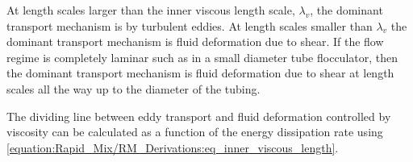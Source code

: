 \documentclass[letterpaper,10pt,english]{sphinxmanual}
\begin{document}
At length scales larger than the inner viscous length scale, \(\lambda_v\), the dominant transport mechanism is by turbulent eddies. At length scales smaller than \(\lambda_v\) the dominant transport mechanism is fluid deformation due to shear. If the flow regime is completely laminar such as in a small diameter tube flocculator, then the dominant transport mechanism is fluid deformation due to shear at length scales all the way up to the diameter of the tubing.

The dividing line between eddy transport and fluid deformation controlled by viscosity can be calculated as a function of the energy dissipation rate using \eqref{equation:Rapid_Mix/RM_Derivations:eq_inner_viscous_length}.

%
\begin{sphinxVerbatim}[commandchars=\\\{\}]
  
  
   
   
   
  
  
  
  
        


\end{sphinxVerbatim}
\end{document}
